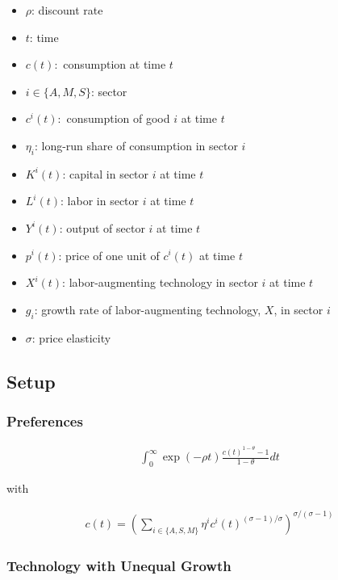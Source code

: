 \documentclass[10pt]{article}
\begin{document}
\begin{itemize}
    \item $\rho$: discount rate 
    \item $t$: time 
    \item $c(t):$ consumption at time $t$
    \item $i \in \{A, M, S\}$: sector
    \item $c^i(t):$ consumption of good $i$ at time $t$
    \item $\eta_i$: long-run share of consumption in sector $i$
    \item $K^i(t)$: capital in sector $i$ at time $t$
    \item $L^i(t)$: labor in sector $i$ at time $t$
    \item $Y^i(t)$: output of sector $i$ at time $t$
    \item $p^i(t)$: price of one unit of $c^i(t)$ at time $t$
    \item $X^i(t)$: labor-augmenting technology in sector $i$ at time $t$
    \item $g_i$: growth rate of labor-augmenting technology, $X$, in sector $i$
    \item $\sigma$: price elasticity
\end{itemize}

\subsection{Setup}

\subsubsection{Preferences}

\begin{align}
    \int_0^{\infty} \exp (-\rho t) \frac{c(t)^{1-\theta}-1}{1-\theta} dt
\end{align}

with 

\begin{align}
    c(t)=\left(\sum_{i \in\{A, S, M\}} \eta^i c^i(t)^{(\sigma-1) / \sigma}\right)^{\sigma /(\sigma-1)}
\end{align}


\subsubsection{Technology with Unequal Growth}
\end{document}
